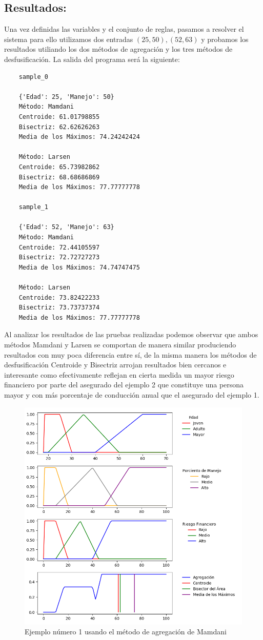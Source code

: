 \documentclass[10pt,letterpaper]{article}
\begin{document}
\begin{enumerate}
\section{Resultados:}
Una vez definidas las variables y el conjunto de reglas, pasamos a resolver el sistema para ello utilizamos dos entradas $(25, 50), (52, 63)$ y probamos los resultados utiliando los dos métodos de agregación y los tres métodos de desfusificación. La salida del programa será la siguiente:

		
\begin{verbatim}
	sample_0
	
	{'Edad': 25, 'Manejo': 50}
	Método: Mamdani
	Centroide: 61.01798855
	Bisectriz: 62.62626263
	Media de los Máximos: 74.24242424
	
	Método: Larsen
	Centroide: 65.73982862
	Bisectriz: 68.68686869
	Media de los Máximos: 77.77777778
	
	sample_1
	
	{'Edad': 52, 'Manejo': 63}
	Método: Mamdani
	Centroide: 72.44105597
	Bisectriz: 72.72727273
	Media de los Máximos: 74.74747475
	
	Método: Larsen
	Centroide: 73.82422233
	Bisectriz: 73.73737374
	Media de los Máximos: 77.77777778
\end{verbatim}

\end{enumerate}

\vspace{1cm}

Al analizar los resultados de las pruebas realizadas podemos observar que ambos métodos Mamdani y Larsen se comportan de manera similar produciendo resultados con muy poca diferencia entre sí, de la misma manera los métodos de desfusificación Centroide y Bisectriz arrojan resultados bien cercanos e interesante como efectivamente reflejan en cierta medida un mayor riesgo financiero por parte del asegurado del ejemplo 2 que constituye una persona mayor y con más porcentaje de conducción anual que el asegurado del ejemplo 1.


\begin{figure}
	\includegraphics[width=\linewidth]{Figure_1.png}
	\caption{Ejemplo número 1 usando el método de agregación de Mamdani}
\end{figure}
 
 
		
\end{document}
